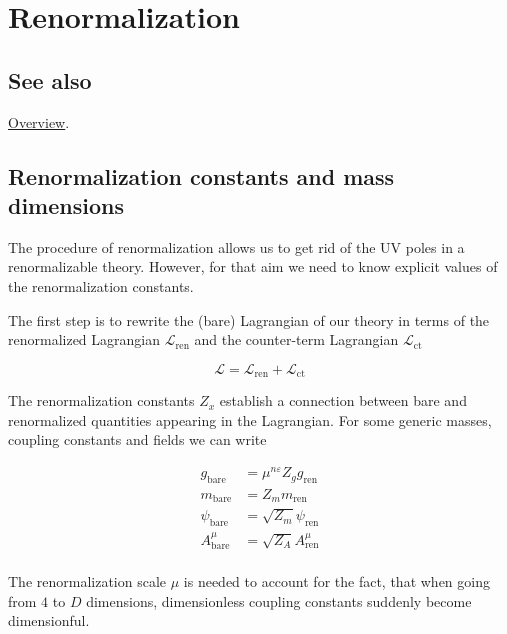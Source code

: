 \documentclass[../FeynCalcManual.tex]{subfiles}
\begin{document}
\hypertarget{renormalization}{
\section{Renormalization}\label{renormalization}}

\subsection{See also}

\hyperlink{toc}{Overview}.

\hypertarget{renormalization-constants-and-mass-dimensions}{%
\subsection{Renormalization constants and mass
dimensions}\label{renormalization-constants-and-mass-dimensions}}

The procedure of renormalization allows us to get rid of the UV poles in
a renormalizable theory. However, for that aim we need to know explicit
values of the renormalization constants.

The first step is to rewrite the (bare) Lagrangian of our theory in
terms of the renormalized Lagrangian \(\mathcal{L}_{\textrm{ren}}\) and
the counter-term Lagrangian \(\mathcal{L}_{\textrm{ct}}\)

\begin{equation}
\mathcal{L}  = \mathcal{L}_{\textrm{ren}} + \mathcal{L}_{\textrm{ct}}
\end{equation}

The renormalization constants \(Z_x\) establish a connection between
bare and renormalized quantities appearing in the Lagrangian. For some
generic masses, coupling constants and fields we can write

\begin{align*}
g_{\textrm{bare}} &=  \mu^{n \varepsilon} Z_g g_{\textrm{ren}} \\
m_{\textrm{bare}} &=  Z_m m_{\textrm{ren}} \\
\psi_{\textrm{bare}} &=  \sqrt{Z_m} \psi_{\textrm{ren}} \\
A^\mu_{\textrm{bare}} &=  \sqrt{Z_A} A^\mu_{\textrm{ren}} \\
\end{align*}

The renormalization scale \(\mu\) is needed to account for the fact,
that when going from \(4\) to \(D\) dimensions, dimensionless coupling
constants suddenly become dimensionful.
\end{document}
